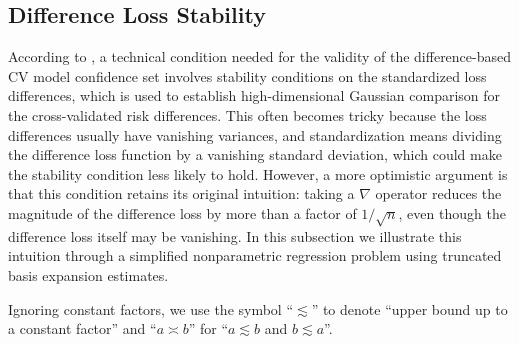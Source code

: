 \documentclass[11pt]{article}
\theoremstyle{plain}
\begin{document}
\subsection{Difference Loss Stability}\label{subsec:6.3-stab-diff}
According to , a technical condition needed for the validity of the difference-based CV model confidence set involves stability conditions on the standardized loss differences, which is used to establish high-dimensional Gaussian comparison for the cross-validated risk differences. This often becomes tricky because the loss differences usually have vanishing variances, and standardization means dividing the difference loss function by a vanishing standard deviation, which could make the stability condition less likely to hold.  However, a more optimistic argument is that this condition retains its original intuition: taking a $\nabla$ operator reduces the magnitude of the difference loss by more than a factor of $1/\sqrt{n}$, even though the difference loss itself may be vanishing.  In this subsection we illustrate this intuition through a simplified nonparametric regression problem using truncated basis expansion estimates.

Ignoring constant factors, we use the symbol ``$\lesssim$'' to denote ``upper bound up to a constant factor'' and ``$a\asymp b$'' for ``$a\lesssim b$ and $b\lesssim a$''.
\end{document}
